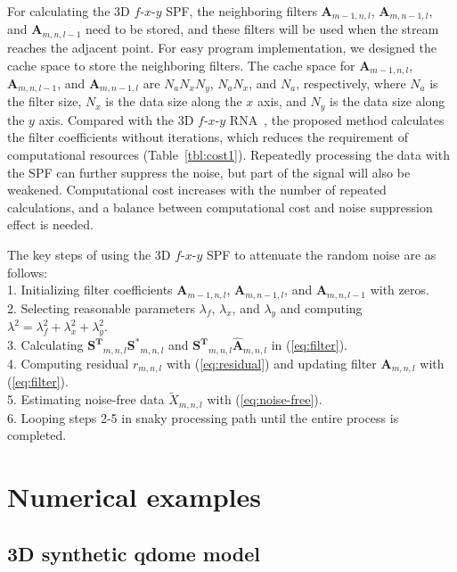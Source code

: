 For calculating the 3D $f$-$x$-$y$ SPF, the neighboring filters
$\mathbf{A}_{m-1,n,l}$, $\mathbf{A}_{m,n-1,l}$, and
$\mathbf{A}_{m,n,l-1}$ need to be stored, and these filters will be
used when the stream reaches the adjacent point.  For easy program
implementation, we designed the cache space to store the neighboring
filters. The cache space for $\mathbf{A}_{m-1,n,l}$,
$\mathbf{A}_{m,n,l-1}$, and $\mathbf{A}_{m,n-1,l}$ are
$N_{a}N_{x}N_{y}$, $N_{a}N_{x}$, and $N_{a}$, respectively, where
$N_a$ is the filter size, $N_x$ is the data size along the $x$ axis,
and $N_y$ is the data size along the $y$ axis.  Compared with the 3D
$f$-$x$-$y$ RNA~\cite{Liug13}, the proposed method calculates the
filter coefficients without iterations, which reduces the requirement
of computational resources (Table~\ref{tbl:cost1}).  Repeatedly
processing the data with the SPF can further suppress the noise, but
part of the signal will also be weakened. Computational cost increases
with the number of repeated calculations, and a balance between
computational cost and noise suppression effect is needed.

The key steps of using the 3D $f$-$x$-$y$ SPF to attenuate
the random noise are as follows: \\
1. Initializing filter coefficients $ \mathbf{A}_{m-1,n,l}$,
$ \mathbf{A}_{m,n-1,l}$, and $\mathbf{A}_{m,n,l-1}$ with zeros.\\
2. Selecting reasonable parameters $\lambda_{f}$, $\lambda_{x}$,
and $\lambda_{y}$ and computing $ \lambda^{2} = \lambda_{f}^{2} + \lambda_{x}^{2} + \lambda_{y}^{2} $.\\
3. Calculating $\mathbf{S^{T}}_{m,n,l}\mathbf{S^{*}}_{m,n,l}$ and
$\mathbf{S^{T}}_{m,n,l}\mathbf{\hat{A}}_{m,n,l}$ in (\ref{eq:filter}).\\
4. Computing residual $r_{m,n,l}$ with (\ref{eq:residual}) and
updating filter
$\mathbf{A}_{m,n,l}$ with (\ref{eq:filter}).\\
5. Estimating noise-free data $\tilde{X}_{m,n,l}$ with (\ref{eq:noise-free}).\\
6. Looping steps 2-5 in snaky processing path until the entire process
is completed.

\section{Numerical examples}

\subsection{3D synthetic qdome model}

